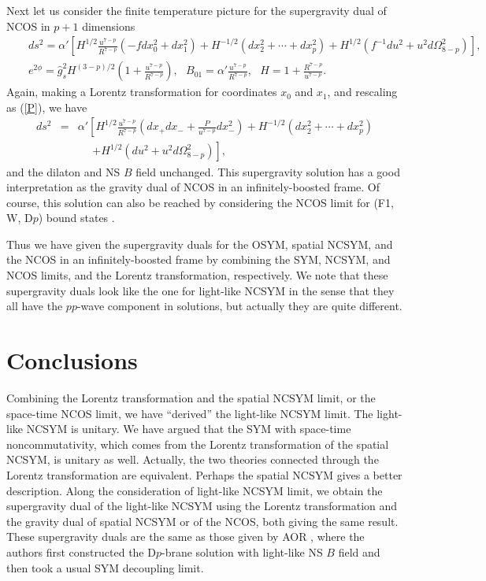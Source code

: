 \documentclass[a4paper,12pt]{article}
\newcommand{\sect}[1]{\setcounter{equation}{0}\section{#1}}
\begin{document}
Next let us consider the finite temperature picture for the supergravity
dual of NCOS in $p+1$ dimensions \cite{Harm1}
\begin{eqnarray}
&& ds^2= \alpha'\left [ H^{1/2}\frac{u^{7-p}}{R^{7-p}}
 \left (-f dx_0^2 +dx_1^2\right) +H^{-1/2} (dx_2^2 +\cdots +dx_p^2 )
 + H^{1/2}(f^{-1}du^2 +u^2d\Omega_{8-p}^2 )\right], \nonumber\\
&& e^{2\phi} =\hat{g}_s^2 H^{(3-p)/2}\left(1+\frac{u^{7-p}}{R^{7-p}}\right),
 \ \ \ B_{01}=\alpha' \frac{u^{7-p}}{R^{7-p}}, \ \ \
 H = 1+\frac{R^{7-p}}{u^{7-p}}.
\end{eqnarray}
Again, making a Lorentz transformation for coordinates $x_0$ and $x_1$,
and rescaling as (\ref{P}), we have
\begin{eqnarray}
 ds^2 &=& \alpha'\left [ H^{1/2}\frac{u^{7-p}}{R^{7-p}}
 \left ( dx_+dx_- + \frac{P}{u^{7-p}}dx_-^2\right)
 +H^{-1/2} (dx_2^2 +\cdots +dx_p^2 )
 \right. \nonumber \\
 & &~~~~~~ \left. + H^{1/2}(du^2 +u^2d\Omega_{8-p}^2 )\right],
\end{eqnarray}
and the dilaton and NS $B$ field unchanged.
This supergravity solution has a good
interpretation as the gravity dual of NCOS in an infinitely-boosted frame.
Of course, this solution can also be reached by considering the NCOS limit
for (F1, W, D$p$) bound states \cite{Lu2}.

Thus we have given the supergravity duals for the OSYM, spatial NCSYM, and
the NCOS in an infinitely-boosted frame by combining the SYM, NCSYM, and
NCOS limits, and the Lorentz transformation, respectively. We note that these
supergravity duals look like the one for light-like NCSYM in the sense that
they all have the $pp$-wave component in solutions, but actually they are
quite different.


\sect{Conclusions}

Combining the Lorentz transformation and the spatial NCSYM limit, or the
space-time NCOS limit, we have ``derived'' the light-like NCSYM limit.
The light-like NCSYM is unitary. We have argued that the SYM with space-time
noncommutativity, which comes from the Lorentz transformation of the
spatial NCSYM, is unitary as well. Actually, the two theories
connected through the Lorentz transformation are equivalent. Perhaps the
spatial NCSYM gives a better description. Along the consideration
of light-like NCSYM limit, we obtain the supergravity dual
of the light-like NCSYM using the Lorentz transformation and the gravity
dual of spatial NCSYM or of the NCOS, both giving the same result.
These supergravity duals are the same as those given by
AOR \cite{AOR}, where the authors first constructed the D$p$-brane solution
with light-like NS $B$ field and then took a usual SYM decoupling limit.
\end{document}
